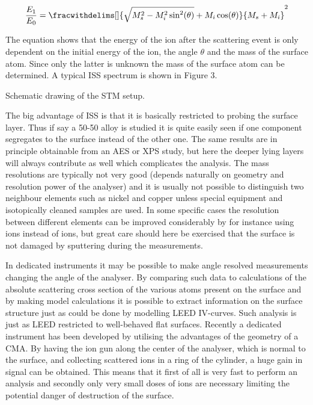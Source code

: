 \begin{equation}
\frac{E_1}{E_0}=\fracwithdelims[]{\sqrt{M_s^2-M_i^2\sin^2(\theta)}+M_i\cos(\theta)}{M_s+M_i}^2
\end{equation}

The equation shows that the energy of the ion after the scattering event is only dependent on the initial energy of the ion, the angle $\theta$ and the mass of the surface atom. Since only the latter is unknown the mass of the surface atom can be determined. A typical ISS spectrum is shown in Figure 3. 

\vspace*{11cm}

 Schematic drawing of the STM setup.

\vspace{1cm}

The big advantage of ISS is that it is basically restricted to probing the surface layer. Thus if  say a 50-50 alloy is studied it is quite easily seen if one component segregates to the surface instead of the other one. The same results are in principle obtainable from an AES or XPS study, but here the deeper lying layers will always contribute as well which complicates the analysis. The mass resolutions are typically not very good (depends naturally on geometry and resolution power of the analyser) and it is usually not possible to distinguish two neighbour elements such as nickel and copper unless special equipment and isotopically cleaned samples are used. In some specific cases the resolution between different elements can be improved considerably by for instance using  ions instead of  ions, but great care should here be exercised that the surface is not damaged by sputtering during the measurements.

In dedicated instruments it may be possible to make angle resolved measurements changing the  angle of the analyser. By comparing such data to calculations of the absolute scattering cross section of the various atoms present on the surface and by making model calculations it is possible to extract information on the surface structure just as could be done by modelling LEED IV-curves. Such analysis is just as LEED restricted to well-behaved flat surfaces. Recently a dedicated instrument has been developed by \cite{Brongersma} utilising the advantages of the geometry of a CMA. By having the ion gun along the center of the analyser, which is normal to the surface, and collecting scattered ions in a ring  of the cylinder, a huge gain in signal can be obtained. This means that it first of all is very fast to perform an analysis and secondly only very small doses of ions are necessary limiting the potential danger of destruction of the surface.

